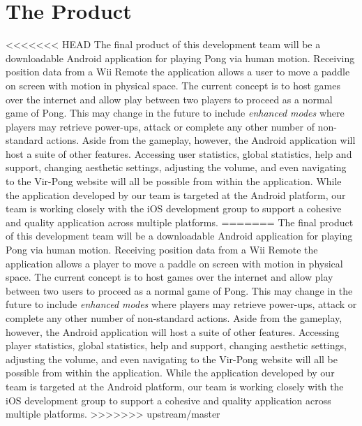 \documentclass[12pt]{article}
\begin{document}
\section{The Product}
<<<<<<< HEAD
The final product of this development team will be a downloadable Android application for playing Pong via human motion.  Receiving position data from a Wii Remote the application allows a user to move a paddle on screen with motion in physical space.  The current concept is to host games over the internet and allow play between two players to proceed as a normal game of Pong.  This may change in the future to include \textit{enhanced modes} where players may retrieve power-ups, attack or complete any other number of non-standard actions.  Aside from the gameplay, however, the Android application will host a suite of other features.  Accessing user statistics, global statistics, help and support, changing aesthetic settings, adjusting the volume, and even navigating to the Vir-Pong website will all be possible from within the application.  While the application developed by our team is targeted at the Android platform, our team is working closely with the iOS development group to support a cohesive and quality application across multiple platforms.  
=======
The final product of this development team will be a downloadable Android application for playing Pong via human motion.  Receiving position data from a Wii Remote the application allows a player to move a paddle on screen with motion in physical space.  The current concept is to host games over the internet and allow play between two users to proceed as a normal game of Pong.  This may change in the future to include \textit{enhanced modes} where players may retrieve power-ups, attack or complete any other number of non-standard actions.  Aside from the gameplay, however, the Android application will host a suite of other features.  Accessing player statistics, global statistics, help and support, changing aesthetic settings, adjusting the volume, and even navigating to the Vir-Pong website will all be possible from within the application.  While the application developed by our team is targeted at the Android platform, our team is working closely with the iOS development group to support a cohesive and quality application across multiple platforms.  
>>>>>>> upstream/master
\end{document}
